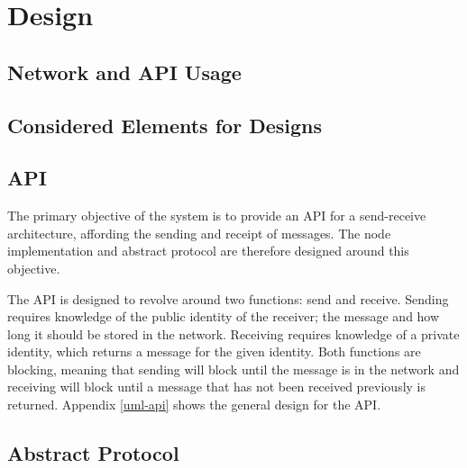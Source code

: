 \section{Design} \label{design}

	\subsection{Network and API Usage}
		
	\subsection{Considered Elements for Designs}
		
		
	\subsection{API} %
		The primary objective of the system is to provide an API for a send-receive architecture, affording the sending and receipt of messages. The node implementation and abstract protocol are therefore designed around this objective.
		
		The API is designed to revolve around two functions: send and receive. Sending requires knowledge of the public identity of the receiver; the message and how long it should be stored in the network. Receiving requires knowledge of a private identity, which returns a message for the given identity. Both functions are blocking, meaning that sending will block until the message is in the network and receiving will block until a message that has not been received previously is returned. Appendix \ref{uml-api} shows the general design for the API.
	\subsection{Abstract Protocol} %
			
			